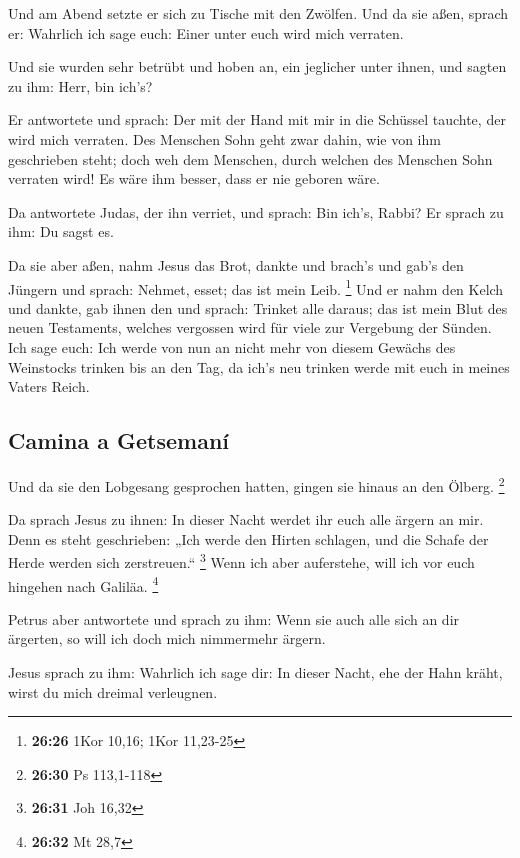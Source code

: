  Und am Abend setzte er sich zu Tische mit den Zwölfen.
 Und da sie aßen, sprach er: Wahrlich ich sage euch:
Einer unter euch wird mich verraten.

 Und sie wurden sehr betrübt und hoben an, ein jeglicher
unter ihnen, und sagten zu ihm: Herr, bin ich's?

 Er antwortete und sprach: Der mit der Hand mit mir in
die Schüssel tauchte, der wird mich verraten.  Des
Menschen Sohn geht zwar dahin, wie von ihm geschrieben steht; doch weh
dem Menschen, durch welchen des Menschen Sohn verraten wird! Es wäre ihm
besser, dass er nie geboren wäre.

 Da antwortete Judas, der ihn verriet, und sprach: Bin
ich's, Rabbi? Er sprach zu ihm: Du sagst es.

 Da sie aber aßen, nahm Jesus das Brot, dankte und
brach's und gab's den Jüngern und sprach: Nehmet, esset; das ist mein
Leib. \footnote{\textbf{26:26} 1Kor 10,16; 1Kor 11,23-25}
 Und er nahm den Kelch und dankte, gab ihnen den und
sprach: Trinket alle daraus;  das ist mein Blut des neuen
Testaments, welches vergossen wird für viele zur Vergebung der Sünden.
 Ich sage euch: Ich werde von nun an nicht mehr von
diesem Gewächs des Weinstocks trinken bis an den Tag, da ich's neu
trinken werde mit euch in meines Vaters Reich.

\hypertarget{camina-a-getsemanuxed}{%
\subsection{Camina a Getsemaní}\label{camina-a-getsemanuxed}}

 Und da sie den Lobgesang gesprochen hatten, gingen sie
hinaus an den Ölberg. \footnote{\textbf{26:30} Ps 113,1-118}

 Da sprach Jesus zu ihnen: In dieser Nacht werdet ihr
euch alle ärgern an mir. Denn es steht geschrieben: „Ich werde den
Hirten schlagen, und die Schafe der Herde werden sich zerstreuen.``
\footnote{\textbf{26:31} Joh 16,32}  Wenn ich aber
auferstehe, will ich vor euch hingehen nach Galiläa. \footnote{\textbf{26:32}
  Mt 28,7}

 Petrus aber antwortete und sprach zu ihm: Wenn sie auch
alle sich an dir ärgerten, so will ich doch mich nimmermehr ärgern.

 Jesus sprach zu ihm: Wahrlich ich sage dir: In dieser
Nacht, ehe der Hahn kräht, wirst du mich dreimal verleugnen.

